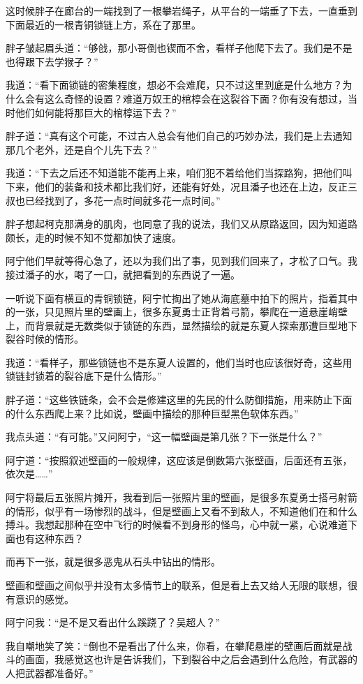 这时候胖子在廊台的一端找到了一根攀岩绳子，从平台的一端垂了下去，一直垂到下面最近的一根青铜锁链上方，系在了那里。

胖子皱起眉头道：“够戗，那小哥倒也锲而不舍，看样子他爬下去了。我们是不是也得跟下去学猴子？”

我道：“看下面锁链的密集程度，想必不会难爬，只不过这里到底是什么地方？为什么会有这么奇怪的设置？难道万奴王的棺椁会在这裂谷下面？你有没有想过，当时他们如何能将那巨大的棺椁运下去？”

胖子道：“真有这个可能，不过古人总会有他们自己的巧妙办法，我们是上去通知那几个老外，还是自个儿先下去？”

我道：“下去之后还不知道能不能再上来，咱们犯不着给他们当探路狗，把他们叫下来，他们的装备和技术都比我们好，还能有好处，况且潘子也还在上边，反正三叔也已经找到了，多花一点时间就多花一点时间。”

胖子想起柯克那满身的肌肉，也同意了我的说法，我们又从原路返回，因为知道路颇长，走的时候不知不觉都加快了速度。

阿宁他们早就等得心急了，还以为我们出了事，见到我们回来了，才松了口气。我接过潘子的水，喝了一口，就把看到的东西说了一遍。

一听说下面有横亘的青铜锁链，阿宁忙掏出了她从海底墓中拍下的照片，指着其中的一张，只见照片里的壁画上，很多东夏勇士正背着弓箭，攀爬在一道悬崖峭壁上，而背景就是无数类似于锁链的东西，显然描绘的就是东夏人探索那遭巨型地下裂谷时候的情形。

我道：“看样子，那些锁链也不是东夏人设置的，他们当时也应该很好奇，这些用锁链封锁着的裂谷底下是什么情形。”

胖子道：“这些铁链条，会不会是修建这里的先民的什么防御措施，用来防止下面的什么东西爬上来？比如说，壁画中描绘的那种巨型黑色软体东西。”

我点头道：“有可能。”又问阿宁，“这一幅壁画是第几张？下一张是什么？”

阿宁道：“按照叙述壁画的一般规律，这应该是倒数第六张壁画，后面还有五张，依次是……”

阿宁将最后五张照片摊开，我看到后一张照片里的壁画，是很多东夏勇士搭弓射箭的情形，似乎有一场惨烈的战斗，但是壁画上又看不到敌人，不知道他们在和什么搏斗。我想起那种在空中飞行的时候看不到身形的怪鸟，心中就一紧，心说难道下面也有这种东西？

而再下一张，就是很多恶鬼从石头中钻出的情形。

壁画和壁画之间似乎并没有太多情节上的联系，但是看上去又给人无限的联想，很有意识的感觉。

阿宁问我：“是不是又看出什么蹊跷了？吴超人？”

我自嘲地笑了笑：“倒也不是看出了什么来，你看，在攀爬悬崖的壁画后面就是战斗的画面，我感觉这也许是告诉我们，下到裂谷中之后会遇到什么危险，有武器的人把武器都准备好。”

